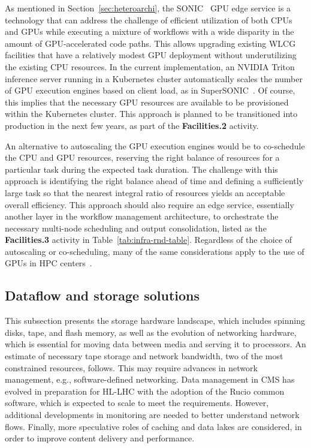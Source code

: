 As mentioned in Section~\ref{sec:heteroarchi}, the \gls{SONIC}~\cite{CMS:2024twn} \gls{GPU} edge service is a technology that can address the challenge of efficient utilization of both \glspl{CPU} and \glspl{GPU} while executing a mixture of workflows with a wide disparity in the amount of \gls{GPU}-accelerated code paths. This allows upgrading existing \gls{WLCG} facilities that have a relatively modest \gls{GPU} deployment without underutilizing the existing \gls{CPU} resources. In the current implementation, an NVIDIA Triton inference server running in a Kubernetes cluster automatically scales the number of \gls{GPU} execution engines based on client load, as in SuperSONIC~\cite{Kondratyev:2025jfj}. Of course, this implies that the necessary \gls{GPU} resources are available to be provisioned within the Kubernetes cluster. This approach is planned to be transitioned into production in the next few years, as part of the \textbf{Facilities.2} activity.

An alternative to autoscaling the \gls{GPU} execution engines would be to co-schedule the \gls{CPU} and \gls{GPU} resources, reserving the right balance of resources for a particular task during the expected task duration. The challenge with this approach is identifying the right balance ahead of time and defining a sufficiently large task so that the nearest integral ratio of resources yields an acceptable overall efficiency. This approach should also require an edge service, essentially another layer in the workflow management architecture, to orchestrate the necessary multi-node scheduling and output consolidation, listed as the \textbf{Facilities.3} activity in Table~\ref{tab:infra-rnd-table}. Regardless of the choice of autoscaling or co-scheduling, many of the same considerations apply to the use of \glspl{GPU} in \gls{HPC} centers~\cite{Agarwal:2023rwr}.



\subsection{Dataflow and storage solutions}
\label{sec:dataflow}

This subsection presents the storage hardware landscape, which includes spinning disks, tape, and flash memory, as well as the evolution of networking hardware, which is essential for moving data between media and serving it to processors.  An estimate of necessary tape storage and network bandwidth, two of the most constrained resources, follows. This may require advances in network management, e.g., software-defined networking. Data management in CMS has evolved in preparation for \gls{HL-LHC} with the adoption of the Rucio common software, which is expected to scale to meet the requirements. However, additional developments in monitoring are needed to better understand network flows. 
Finally, more speculative roles of caching and data lakes are considered, in order to improve content delivery and performance.

